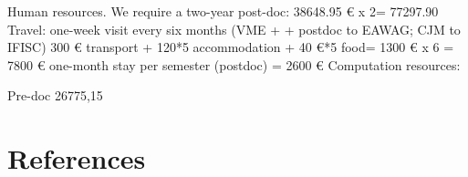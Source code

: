 \documentclass[authoryear,1p,12pt]{elsarticle}
\begin{document}
     Human resources.
     We require a two-year post-doc: 38648.95 € x 2= 77297.90
     Travel: one-week visit every six months (VME + + postdoc to EAWAG; CJM to IFISC) 300 € transport + 120*5 accommodation + 40 €*5 food= 1300 € x 6 = 7800 €
     one-month stay per semester (postdoc) = 2600 €
     Computation resources: 
     
     Pre-doc 26775,15

     \newpage
     \section{References}


\end{document}
